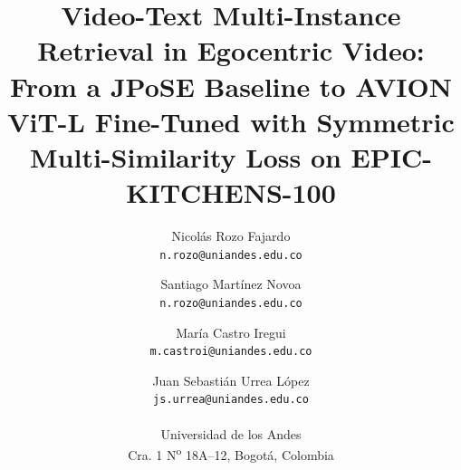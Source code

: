 \documentclass[10pt,twocolumn,letterpaper]{article}
\title{Video-Text Multi-Instance Retrieval in Egocentric Video: From a JPoSE Baseline to AVION ViT-L Fine-Tuned with Symmetric Multi-Similarity Loss on EPIC-KITCHENS-100}
\author{Nicolás Rozo Fajardo\\
{\tt\small n.rozo@uniandes.edu.co}
\and
Santiago Martínez Novoa \\
{\tt\small n.rozo@uniandes.edu.co}
\and
Mar\'ia Castro Iregui  \\
{\tt\small m.castroi@uniandes.edu.co}
\and
Juan Sebastián Urrea L\'opez\\
{\tt\small js.urrea@uniandes.edu.co} \\
\\
Universidad de los Andes \\
Cra. 1 N\textsuperscript{o} 18A--12, Bogot\'a, Colombia \\
}
\begin{document}
\maketitle
    







{
    \small
    
    
}

% 
\end{document}
